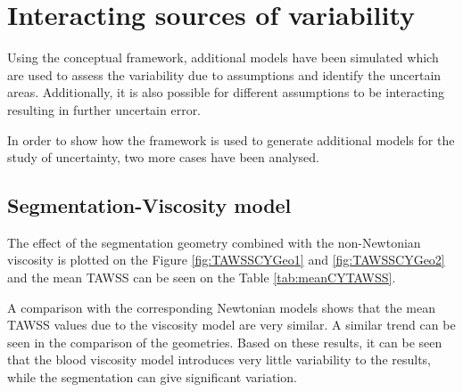 \section{Interacting sources of variability}
Using the conceptual framework, additional models have been simulated which are used to assess the variability due to assumptions and identify the uncertain areas. Additionally, it is also possible for different assumptions to be interacting resulting in further uncertain error.\par

In order to show how the framework is used to generate additional models for the study of uncertainty, two more cases have been analysed. \par

\subsection{Segmentation-Viscosity model}
The effect of the segmentation geometry combined with the non-Newtonian viscosity is plotted on the Figure \ref{fig:TAWSSCYGeo1} and \ref{fig:TAWSSCYGeo2} and the mean TAWSS can be seen on the Table \ref{tab:meanCYTAWSS}. \par

A comparison with the corresponding Newtonian models shows that the mean TAWSS values due to the viscosity model are very similar. A similar trend can be seen in the comparison of the geometries. Based on these results, it can be seen that the blood viscosity model introduces very little variability to the results, while the segmentation can give significant variation.  

\begin{table}[ht!]
\caption{The mean TAWSS and the standard deviation (SD) of segmentation and viscosity model}
\label{tab:meanCYTAWSS}
\end{table}

